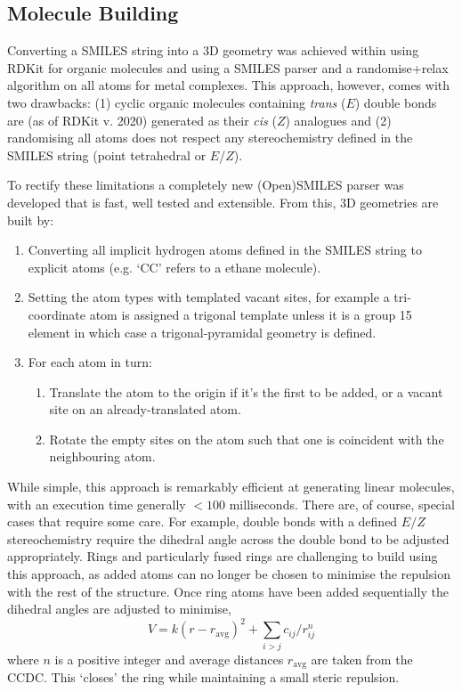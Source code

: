 \documentclass[../../main.tex]{subfiles}
\begin{document}
\subsection{Molecule Building}

Converting a SMILES string into a 3D geometry was achieved within \ade using RDKit\cite{Landrum2019} for organic molecules and using a SMILES parser and a randomise+relax algorithm on all atoms for metal complexes. This approach, however, comes with two drawbacks: (1) cyclic organic molecules containing \emph{trans} ($E$) double bonds are (as of RDKit v. 2020) generated as their \emph{cis} ($Z$) analogues and (2) randomising all atoms does not respect any stereochemistry defined in the SMILES string (point tetrahedral or $E$/$Z$).

To rectify these limitations a completely new (Open)SMILES parser was developed that is fast, well tested and extensible. From this, 3D geometries are built by:

\begin{enumerate}
	\item Converting all implicit hydrogen atoms defined in the SMILES string to explicit atoms (e.g. `CC' refers to a ethane molecule).
	\item Setting the atom types with templated vacant sites, for example a tri-coordinate atom is assigned a trigonal template unless it is a group 15 element in which case a trigonal-pyramidal geometry is defined. 
	\item For each atom in turn:
	\begin{enumerate}
		\item Translate the atom to the origin if it's the first to be added, or a vacant site on an already-translated atom.
		\item Rotate the empty sites on the atom such that one is coincident with the neighbouring atom.
	\end{enumerate}
\end{enumerate}

While simple, this approach is remarkably efficient at generating linear molecules, with an execution time generally $<100$ milliseconds. There are, of course, special cases that require some care. For example, double bonds with a defined $E/Z$ stereochemistry require the dihedral angle across the double bond to be adjusted appropriately. Rings and particularly fused rings are challenging to build using this approach, as added atoms can no longer be chosen to minimise the repulsion with the rest of the structure. Once ring atoms have been added sequentially the dihedral angles are adjusted to minimise,
\begin{equation}
	V = k(r-r_\text{avg})^2 + \sum_{i>j} {c_{ij}}/{r_{ij}^n}
\end{equation}
where $n$ is a positive integer and average distances $r_\text{avg}$ are taken from the CCDC. This `closes' the ring while maintaining a small steric repulsion. 
\end{document}
